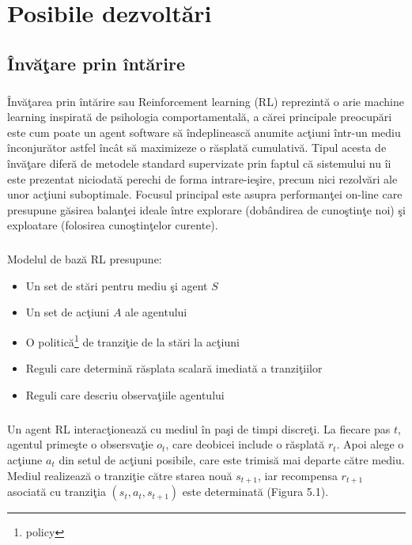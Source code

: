 \chapter{Posibile dezvolt\u ari}

\section{\^ Inv\u a\c tare prin \^ int\u arire}

\paragraph{}
\^ Inv\u a\c tarea prin \^ int\u arire sau Reinforcement learning (RL) reprezint\u a o arie machine learning inspirat\u a de psihologia comportamental\u a, a c\u arei principale preocup\u ari este cum poate un agent software s\u a \^ indeplineasc\u a anumite ac\c tiuni \^ intr-un mediu \^ inconjur\u ator astfel \^ inc\^ at s\u a maximizeze o r\u asplat\u a cumulativ\u a. Tipul acesta de \^ inv\u a\c tare difer\u a de metodele standard supervizate prin faptul c\u a sistemului nu \^ ii este prezentat niciodat\u a perechi de forma intrare-ie\c sire, precum nici rezolv\u ari ale unor ac\c tiuni suboptimale. Focusul principal este asupra performan\c tei on-line care presupune g\u asirea balan\c tei ideale \^ intre explorare (dob\^ andirea de cuno\c stin\c te noi) \c si exploatare (folosirea cuno\c stin\c telor curente). 

\paragraph{}
Modelul de baz\u a RL presupune:

\begin{itemize}
	\item Un set de st\u ari pentru mediu \c si agent \(S\)
	\item Un set de ac\c tiuni \(A\) ale agentului
	\item O politic\u a\footnote{policy} de tranzi\c tie de la st\u ari la ac\c tiuni
	\item Reguli care determin\u a r\u asplata scalar\u a imediat\u a a tranzi\c tiilor
	\item Reguli care descriu observa\c tiile agentului
\end{itemize}

\paragraph{}
Un agent RL interac\c tioneaz\u a cu mediul \^ in pa\c si de timpi discre\c ti. La fiecare pas \(t\), agentul prime\c ste o obsersva\c tie \(o_t\), care deobicei include o r\u asplat\u a \(r_t\). Apoi alege o ac\c tiune \(a_t\) din setul de ac\c tiuni posibile, care este trimis\u a mai departe c\u atre mediu. Mediul realizeaz\u a o tranzi\c tie c\u atre starea nou\u a \(s_{t+1}\), iar recompensa \(r_{t+1}\) asociat\u a cu tranzi\c tia \((s_t, a_t, s_{t+1})\) este determinat\u a (Figura 5.1).

